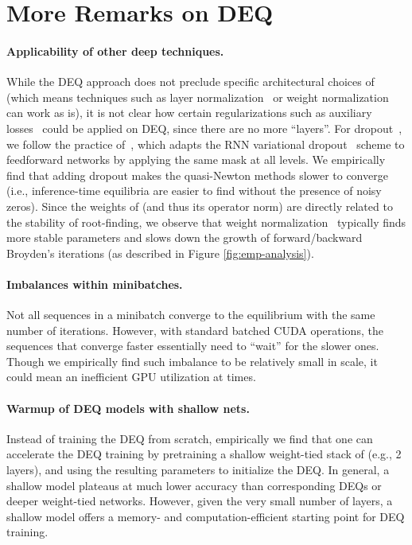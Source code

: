 \documentclass{article}
\begin{document}
\section{More Remarks on DEQ}
\label{app:empirical-remarks}

\paragraph{Applicability of other deep techniques.} While the DEQ approach does not preclude specific architectural choices of  (which means techniques such as layer normalization~\cite{Ba2016layer} or weight normalization~\citep{Salimans2016} can work as is), it is not clear how certain regularizations such as auxiliary losses~\citep{trinh2018learning,bai2018trellis} could be applied on DEQ, since there are no more ``layers''. For dropout~\citep{srivastava2014dropout}, we follow the practice of~\cite{bai2018trellis}, which adapts the RNN variational dropout~\citep{gal2016dropout} scheme to feedforward networks by applying the same mask at all levels. We empirically find that adding dropout makes the quasi-Newton methods slower to converge (i.e., inference-time equilibria are easier to find without the presence of noisy zeros). Since the weights of  (and thus its operator norm) are directly related to the stability of root-finding, we observe that weight normalization~\citep{Salimans2016} typically finds more stable parameters and slows down the growth of forward/backward Broyden's iterations (as described in Figure \ref{fig:emp-analysis}).

\vspace{-2mm}
\paragraph{Imbalances within minibatches.} Not all sequences in a minibatch converge to the equilibrium with the same number of iterations. However, with standard batched CUDA operations, the sequences that converge faster essentially need to ``wait'' for the slower ones. Though we empirically find such imbalance to be relatively small in scale, it could mean an inefficient GPU utilization at times.

\vspace{-2mm}
\paragraph{Warmup of DEQ models with shallow nets.} Instead of training the DEQ from scratch, empirically we find that one can accelerate the DEQ training by pretraining a shallow weight-tied stack of  (e.g., 2 layers), and using the resulting parameters to initialize the DEQ. In general, a shallow model plateaus at much lower accuracy than corresponding DEQs or deeper weight-tied networks. However, given the very small number of layers, a shallow model offers a memory- and computation-efficient starting point for DEQ training.
\end{document}
